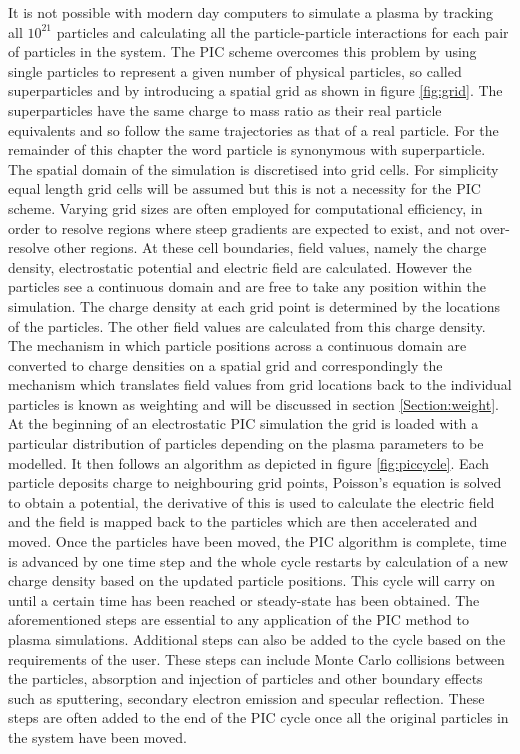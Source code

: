  
It is not possible with modern day computers to simulate a plasma by tracking all $10^{21}$ particles and calculating all the particle-particle interactions for each pair of particles in the system. The PIC scheme overcomes this problem by using single particles to represent a given number of physical particles, so called superparticles and by introducing a spatial grid as shown in figure \ref{fig:grid}. The superparticles have the same charge to mass ratio as their real particle equivalents and so follow the same trajectories as that of a real particle. For the remainder of this chapter the word particle is synonymous with superparticle. The spatial domain of the simulation is discretised into grid cells. For simplicity equal length grid cells will be assumed but this is not a necessity for the PIC scheme. Varying grid sizes are often employed for computational efficiency, in order to resolve regions where steep gradients are expected to exist, and not over-resolve other regions. At these cell boundaries, field values, namely the charge density, electrostatic potential and electric field are calculated. However the particles see a continuous domain and are free to take any position within the simulation. The charge density at each grid point is determined by the locations of the particles. The other field values are calculated from this charge density. The mechanism in which particle positions across a continuous domain are converted to charge densities on a spatial grid and correspondingly the mechanism which translates field values from grid locations back to the individual particles is known as weighting and will be discussed in section \ref{Section:weight}.
At the beginning of an electrostatic PIC simulation the grid is loaded with a particular distribution of particles depending on the plasma parameters to be modelled. It then follows an algorithm as depicted in figure \ref{fig:piccycle}. Each particle deposits charge to neighbouring grid points, Poisson's equation is solved to obtain a potential, the derivative of this is used to calculate the electric field and the field is mapped back to the particles which are then accelerated and moved. Once the particles have been moved, the PIC algorithm is complete, time is advanced by one time step and the whole cycle restarts by calculation of a new charge density based on the updated particle positions. This cycle will carry on until a certain time has been reached or steady-state has been obtained. The aforementioned steps are essential to any application of the PIC method to plasma simulations. Additional steps can also be added to the cycle based on the requirements of the user. These steps can include Monte Carlo collisions between the particles, absorption and injection of particles and other boundary effects such as sputtering, secondary electron emission and specular reflection. These steps are often added to the end of the PIC cycle once all the original particles in the system have been moved. 
